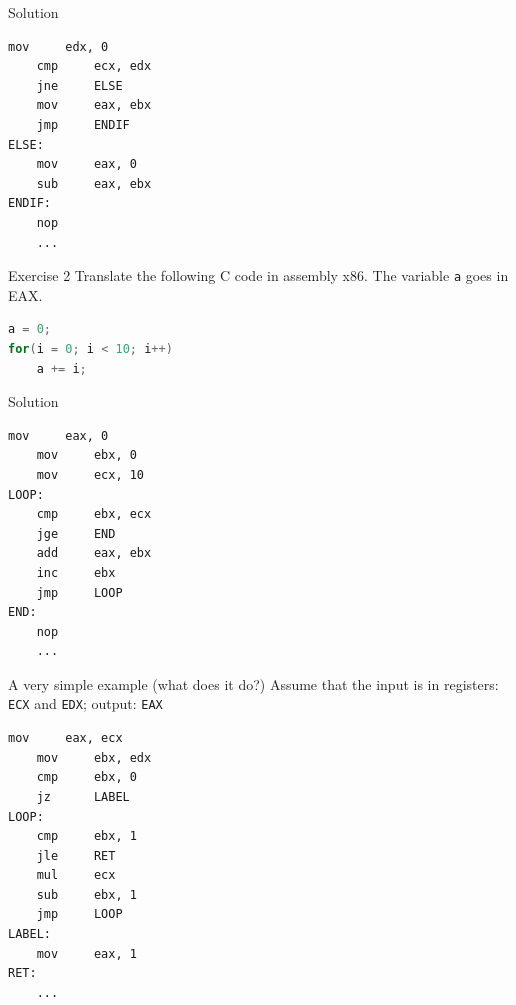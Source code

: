 \documentclass[]{beamer}
\begin{document}
\begin{frame}[fragile]{Solution}
  \begin{lstlisting}[language={[x86masm]Assembler}]
    mov     edx, 0
    cmp     ecx, edx
    jne     ELSE
    mov     eax, ebx
    jmp     ENDIF
ELSE:
    mov     eax, 0
    sub     eax, ebx
ENDIF:
    nop
    ...

\end{lstlisting}
\end{frame}

\begin{frame}[fragile]{Exercise 2}
  Translate the following C code in assembly x86. The variable \texttt{a} goes in EAX.
  \begin{lstlisting}[language={C}]
a = 0;
for(i = 0; i < 10; i++)
    a += i;
  \end{lstlisting}
\end{frame}

\begin{frame}[fragile]{Solution}
  \begin{lstlisting}[language={[x86masm]Assembler}]
    mov     eax, 0
    mov     ebx, 0
    mov     ecx, 10
LOOP:
    cmp     ebx, ecx
    jge     END
    add     eax, ebx
    inc     ebx
    jmp     LOOP
END:
    nop
    ...

\end{lstlisting}
\end{frame}

\begin{frame}[fragile]{A very simple example (what does it do?)}
Assume that the input is in registers: {\tt ECX} and {\tt EDX}; output: {\tt EAX}
\begin{lstlisting}[language={[x86masm]Assembler}]
    mov     eax, ecx
    mov     ebx, edx
    cmp     ebx, 0
    jz      LABEL
LOOP:
    cmp     ebx, 1
    jle     RET
    mul     ecx
    sub     ebx, 1
    jmp     LOOP
LABEL:
    mov     eax, 1
RET:
    ...
\end{lstlisting}
\end{frame}
\end{document}
